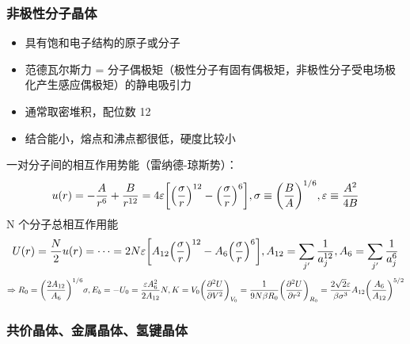 \subsubsection{非极性分子晶体}

\begin{itemize}
    \item 具有饱和电子结构的原子或分子
    \item 范德瓦尔斯力 = 分子偶极矩（极性分子有固有偶极矩，非极性分子受电场极化产生感应偶极矩）的静电吸引力
    \item 通常取密堆积，配位数 12
    \item 结合能小，熔点和沸点都很低，硬度比较小
\end{itemize}

一对分子间的相互作用势能（雷纳德-琼斯势）：{\color{gray}{半经典推导：两个靠近的正负电子对展开成耦合谐振子，进行简正模变换，再量子化，有关于距离的相互作用能}}
\[ u(r) = - \frac{A}{r^6} + \frac{B}{r^{12}} = 4 \varepsilon \qty[\qty(\frac{\sigma}{r})^{12} - \qty(\frac{\sigma}{r})^6], \sigma \equiv \qty(\frac{B}{A})^{1/6}, \varepsilon \equiv \frac{A^2}{4 B} \]
N 个分子总相互作用能
\[ U(r) = \frac{N}{2} u(r) = \cdots = 2 N \varepsilon \qty[A_{12} \qty(\frac{\sigma}{r})^{12} - A_{6} \qty(\frac{\sigma}{r})^6], A_{12} = \sum_{j'} \frac{1}{a^{12}_j}, A_{6} = \sum_{j'} \frac{1}{a^6_j} \]
\[ \Rightarrow R_0 = \qty(\frac{2 A_{12}}{A_6})^{1/6} \sigma, E_b = - U_0 = \frac{\varepsilon A_6^2}{2 A_{12}} N, K = V_0 \qty(\pdv[2]{U}{V})_{V_0} = \frac{1}{9 N \beta R_0} \qty(\pdv[2]{U}{r})_{R_0} = \frac{2 \sqrt{2} \varepsilon}{\beta \sigma^3} A_{12} \qty(\frac{A_6}{A_{12}})^{5/2} \]

\subsubsection{共价晶体、金属晶体、氢键晶体}

